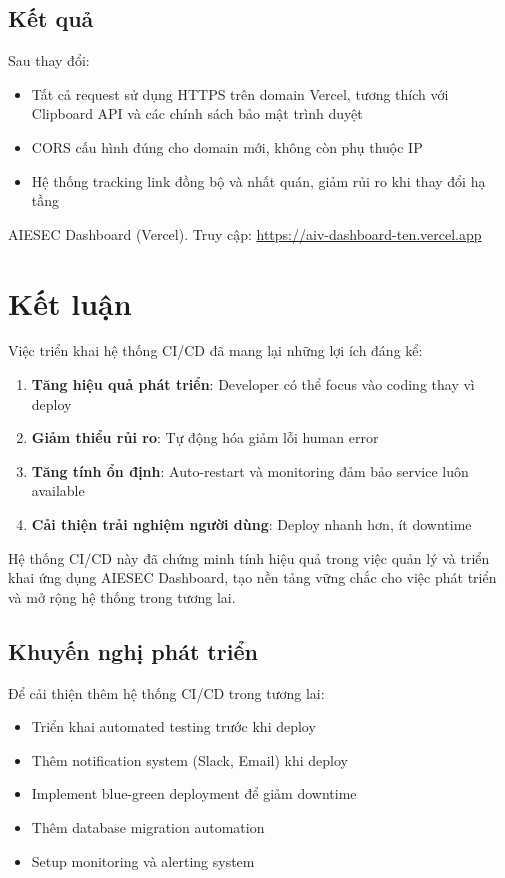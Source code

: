 \documentclass[12pt,a4paper]{article}
\begin{document}
\subsection{Kết quả}

Sau thay đổi:
\begin{itemize}
  \item Tất cả request sử dụng HTTPS trên domain Vercel, tương thích với Clipboard API và các chính sách bảo mật trình duyệt
  \item CORS cấu hình đúng cho domain mới, không còn phụ thuộc IP
  \item Hệ thống tracking link đồng bộ và nhất quán, giảm rủi ro khi thay đổi hạ tầng
\end{itemize}

\begin{thebibliography}{9}
 AIESEC Dashboard (Vercel). Truy cập: \href{https://aiv-dashboard-ten.vercel.app}{https://aiv-dashboard-ten.vercel.app}
\end{thebibliography}

\section{Kết luận}

Việc triển khai hệ thống CI/CD đã mang lại những lợi ích đáng kể:

\begin{enumerate}
    \item \textbf{Tăng hiệu quả phát triển}: Developer có thể focus vào coding thay vì deploy
    \item \textbf{Giảm thiểu rủi ro}: Tự động hóa giảm lỗi human error
    \item \textbf{Tăng tính ổn định}: Auto-restart và monitoring đảm bảo service luôn available
    \item \textbf{Cải thiện trải nghiệm người dùng}: Deploy nhanh hơn, ít downtime
\end{enumerate}

Hệ thống CI/CD này đã chứng minh tính hiệu quả trong việc quản lý và triển khai ứng dụng AIESEC Dashboard, tạo nền tảng vững chắc cho việc phát triển và mở rộng hệ thống trong tương lai.

\subsection{Khuyến nghị phát triển}

Để cải thiện thêm hệ thống CI/CD trong tương lai:

\begin{itemize}
    \item Triển khai automated testing trước khi deploy
    \item Thêm notification system (Slack, Email) khi deploy
    \item Implement blue-green deployment để giảm downtime
    \item Thêm database migration automation
    \item Setup monitoring và alerting system
\end{itemize}
\end{document}
